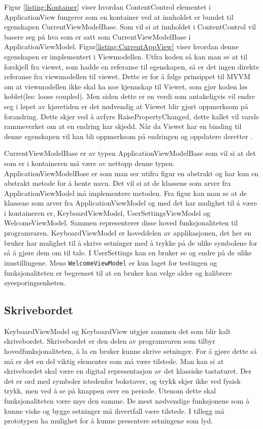 {Figur \ref{listing:Kontainer} viser hvordan ContentControl elementet i ApplicationView fungerer som en kontainer ved at innholdet er bundet til egenskapen CurrentViewModelBase. Som vil si at innholdet i ContentControl vil basere seg på hva som er satt som CurrentViewModelBase i ApplicationViewModel. Figur\ref{listing:CurrentAppView} viser hvordan denne egenskapen er implementert i Viewmodellen. Utfra koden så kan man se at til forskjell fra viewet, som hadde en referanse til egenskapen, så er det ingen direkte referanse fra viewmodellen til viewet. Dette er for å følge prinsippet til MVVM om at viewmodellen ikke skal ha noe kjennskap til Viewet, som gjør koden løs koblet(les: loose coupled). Men siden dette er en verdi som antakeligvis vil endre seg i løpet av kjøretiden er det nødvendig at Viewet blir gjort oppmerksom på forandring. Dette skjer ved å avfyre RaisePropertyChanged, dette kallet vil varsle rammeverket om at en endring har skjedd. Når da Viewet har en binding til denne egenskapen vil han bli oppmerksom på endringen og oppdatere deretter \cite{MVVM4:online}. 
 
CurrentViewModelBase er av typen ApplicationViewModelBase som vil si at det som er i kontaineren må være av nettopp denne typen. ApplicationViewModelBase er som man ser utifra figur  en abstrakt og har kun en abstrakt metode for å hente navn.  Det vil si at de klassene som arver fra ApplicationViewModel må implementere metoden. Fra figur kan man se at de klassene som arver fra ApplicationViewModel og med det har mulighet til å være i kontaineren er, KeyboardViewModel, UserSettingsViewModel og WelcomeViewModel. Sammen representerer disse hoved funksjonaliteten til programvaren. KeyboardViewModel er hoveddelen av applikasjonen, det her en bruker har mulighet til å skrive setninger med å trykke på de ulike symbolene for så å gjøre dem om til tale. I UserSettings kan en bruker se og endre på de ulike innstillingene. Mens \texttt{WelcomeViewModel} er kun laget for testingen og funksjonaliteten er begrenset til at en bruker kan velge alder og kalibrere øyesporingsenheten. 
 
 
 \subsection{Skrivebordet}
 
KeyboardViewModel og KeyboardView utgjør sammen det som blir kalt skrivebordet. Skrivebordet er den delen av programvaren som tilbyr hovedfunksjonaliteten, å la en bruker kunne skrive setninger. For å gjøre dette så må er det en del viktig elementer som må være tilstede. Man kan si at skrivebordet skal være en digital representasjon av det klassiske tastaturet. Der det er ord med symboler istedenfor bokstaver, og trykk skjer ikke ved fysisk trykk, men ved å se på knappen over en periode. Utenom dette skal funksjonaliteten være mye den samme. De mest nødvendige funksjonene som å kunne viske og bygge setninger må ihvertfall være tilstede. I tillegg må prototypen ha mulighet for å kunne presentere setningene som lyd. 

}

